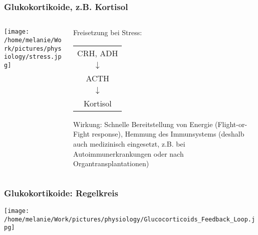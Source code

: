 \documentclass{beamer}
\begin{document}


\begin{frame}
\frametitle{Glukokortikoide, z.B. Kortisol}

\begin{columns}[c]

\begin{column}{5cm}
\begin{center}
\texttt{[image: /home/melanie/Work/pictures/physiology/stress.jpg]}
\end{center}

\end{column}

\begin{column}{5cm}

  
Freisetzung bei Stress: \\[0.2 cm]

\begin{tabular}{c}
CRH, ADH \\
 \(\downarrow\)\\
 ACTH \\
\(\downarrow\) \\
 Kortisol\\[0.5 cm]
\end{tabular}

\pause

Wirkung: Schnelle Bereitstellung von Energie (Flight-or-Fight response), Hemmung des Immunsystems (deshalb auch medizinisch eingesetzt, z.B. bei Autoimmunerkrankungen oder nach Organtransplantationen) \\

\end{column}

  

\end{columns}


\end{frame}



\begin{frame}
\frametitle{Glukokortikoide: Regelkreis}

\begin{center}
\texttt{[image: /home/melanie/Work/pictures/physiology/Glucocorticoids\_Feedback\_Loop.jpg]}
\end{center}


\end{frame}
\end{document}
